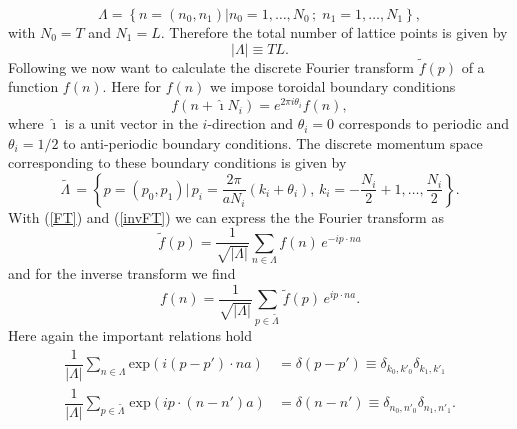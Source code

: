 \begin{equation}
\mathit{\Lambda}=\left\lbrace  n=\left(n_{0},n_{1}\right) \vert n_{0}=1,\ldots,N_{0}\,; \; n_{1}=1,\ldots,N_{1} \right\rbrace,
\end{equation}
with $N_{0}=T$ and $N_{1}=L$. Therefore the total number of lattice points is given by
\begin{equation}
\vert \mathit{\Lambda}\vert \equiv TL.
\end{equation}
Following \cite{gattringer2009quantum} we now want to calculate the discrete Fourier transform $\tilde{f}(p)$ of a function $f(n)$. Here for $f(n)$ we impose toroidal boundary conditions
\begin{equation}
f(n+\hat{\imath}N_{i})= e ^{2\pi i \theta_{i}}f(n),
\label{eq: boundary_cond}
\end{equation}
where $\hat{\imath}$ is a unit vector in the $i$-direction and $\theta_{i}=0$ corresponds to periodic and $\theta_{i}=1/2$ to anti-periodic boundary conditions. The discrete momentum space corresponding to these boundary conditions is given by
\begin{equation}
\mathit{\widetilde{\Lambda\,}}= \left\lbrace p=(p_{0},p_{1}) \vert\, p_{i}=\dfrac{2\pi}{aN_{i}}(k_{i}+\theta_{i}) ,\, k_{i}=-\dfrac{N_{i}}{2}+1,\ldots,\dfrac{N_{i}}{2} \right\rbrace.
\end{equation}
With (\ref{FT}) and (\ref{invFT}) we can express the the Fourier transform as
\begin{equation}
\tilde{f}(p)=\dfrac{1}{\sqrt{\vert\mathit{\Lambda}\vert}} \sum\limits_{n\in \mathit{\Lambda}} f(n)\,  e ^{- i  p\cdot na}
\end{equation}
and for the inverse transform we find
\begin{equation}
f(n) = \dfrac{1}{\sqrt{\vert\mathit{\Lambda}\vert}} \sum\limits_{p\in \widetilde{\mathit{\Lambda}\,}} \tilde{f}(p)\,  e ^{ i p\cdot na}.
\end{equation}
Here again the important relations hold
\begin{align}
\dfrac{1}{\vert\mathit{\Lambda}\vert} \sum\limits_{n\in \mathit{\Lambda}} \text{exp}( i (p-p')\cdot na) &=\delta(p-p') \equiv \delta_{k_{0},k'_{0}}\delta_{k_{1},k'_{1}} \\
\dfrac{1}{\vert\mathit{\Lambda}\vert} \sum\limits_{p\in  \widetilde{\mathit{\Lambda}\,}} \text{exp}( i p\cdot (n-n')a) &=\delta(n-n') \equiv \delta_{n_{0},n'_{0}}\delta_{n_{1},n'_{1}}.
\end{align}
%
%
%
%
%
%
%
%
%
%
%
